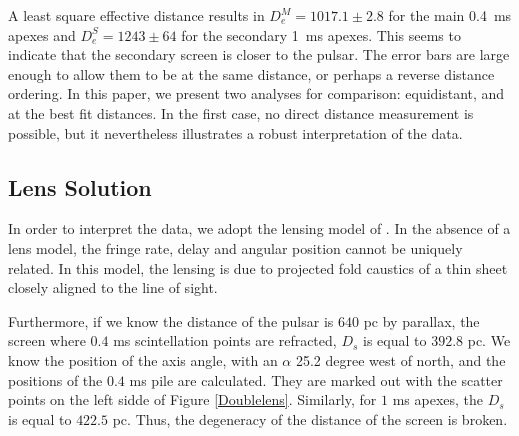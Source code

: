 \documentclass[useAMS,usenatbib]{mn2e}
\begin{document}
A least square effective distance results in
$D_e^M=1017.1\pm 2.8$ for the main 0.4\ ms apexes and
$D_e^S = 1243 \pm 64$ for the secondary 1\ ms apexes. This seems to
indicate that the secondary screen is closer to the pulsar. The error
bars are large enough to allow them to be at the same distance, or
perhaps a reverse distance ordering.  In this paper, we present two
analyses for comparison: equidistant, and at the best fit distances.
In the first case, no direct distance measurement is possible, but it
nevertheless illustrates a robust interpretation of the data.


\subsection{Lens Solution}

In order to interpret the data, we adopt the lensing model of
\citet{2014MNRAS.442.3338P}.  In the absence of a lens model, the
fringe rate, delay and angular position cannot be uniquely related. In
this model, the lensing is due to projected fold caustics of a thin
sheet closely aligned to the line of sight.

Furthermore, if we know the distance of the pulsar is $640$ pc by parallax,
the screen where $0.4$ ms scintellation points are refracted, $D_s$ is equal to $392.8$ pc. We know the position of the axis angle, with an $\alpha$ 25.2 degree west of north, and the positions of the $0.4$ ms pile are calculated. They are marked out with the scatter points on the left sidde of Figure \ref{Doublelens}.
Similarly, for $1$ ms apexes, the $D_s$ is equal to $422.5$ pc. Thus, the degeneracy of the distance of the screen is broken.
\end{document}
